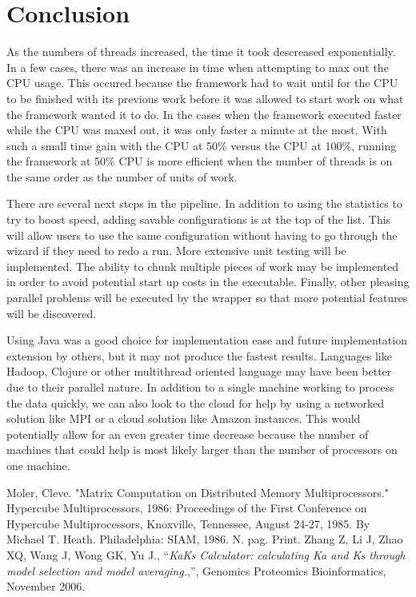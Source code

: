 \documentclass[12pt]{article}
\begin{document}
\section{Conclusion}

As the numbers of threads increased, the time it took descreased exponentially. 
In a few cases, there was an increase in time when attempting to max out the CPU 
usage. This occured because the framework had to wait until for the CPU to be 
finished with its previous work before it was allowed to start work on what the 
framework wanted it to do. In the cases when the framework executed faster while
the CPU was maxed out, it was only faster a minute at the most. With such a
small time gain with the CPU at 50\% versus the CPU at 100\%, running the
framework at 50\% CPU is more efficient when the number of threads is on the
same order as the number of units of work.

There are several next steps in the pipeline. In addition to using the
statistics to try to boost speed, adding savable configurations is at the top of
the list. This will allow users to use the same configuration without having to
go through the wizard if they need to redo a run. More extensive unit testing
will be implemented. The ability to chunk multiple pieces of work may be
implemented in order to avoid potential start up costs in the executable. 
Finally, other pleasing parallel problems will be executed by the wrapper so 
that more potential features will be discovered. 

Using Java was a good choice for implementation ease and future implementation
extension by others, but it may not produce the fastest results. Languages
like Hadoop, Clojure or other multithread oriented language may have been better
due to their parallel nature. In addition to a single machine working to process
the data quickly, we can also look to the cloud for help by using a networked 
solution like MPI or a cloud solution like Amazon instances. This would
potentially allow for an even greater time decrease because the number of
machines that could help is most likely larger than the number of processors on
one machine.

\begin{thebibliography}{1}
Moler, Cleve. "Matrix Computation on Distributed Memory Multiprocessors."
Hypercube Multiprocessors, 1986: Proceedings of the First Conference on
Hypercube Multiprocessors, Knoxville, Tennessee, August 24-27, 1985. By Michael
T. Heath. Philadelphia: SIAM, 1986. N. pag. Print.
Zhang Z, Li J, Zhao XQ, Wang J, Wong GK, Yu J., ``\emph{KaKs Calculator: 
calculating Ka and Ks through model selection and model averaging.},'',
Genomics Proteomics Bioinformatics, November 2006.
\end{thebibliography}
\end{document}
